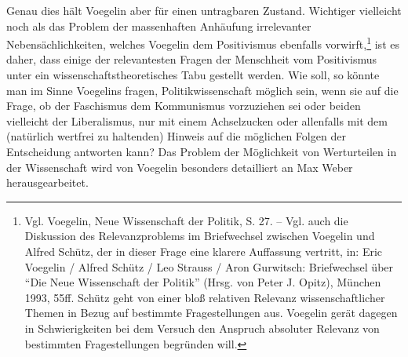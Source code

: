 Genau dies hält Voegelin aber für einen untragbaren Zustand. Wichtiger
vielleicht noch als das Problem der massenhaften Anhäufung irrelevanter
Nebensächlichkeiten, welches Voegelin dem Positivismus ebenfalls
vorwirft,\footnote{Vgl. Voegelin, Neue Wissenschaft der Politik, S. 27. -- Vgl.
  auch die Diskussion des Relevanzproblems im Briefwechsel zwischen Voegelin
  und Alfred Schütz, der in dieser Frage eine klarere Auf\/fassung vertritt,
  in: Eric Voegelin / Alfred Schütz / Leo Strauss / Aron Gurwitsch:
  Briefwechsel über "`Die Neue Wissenschaft der Politik"' (Hrsg. von Peter J.
  Opitz), München 1993, 55ff. Schütz geht von einer bloß relativen Relevanz
  wissenschaftlicher Themen in Bezug auf bestimmte Fragestellungen aus.
  Voegelin gerät dagegen in Schwierigkeiten bei dem Versuch den Anspruch
  absoluter Relevanz von bestimmten Fragestellungen begründen will.} ist es
daher, dass einige der relevantesten Fragen der Menschheit vom Positivismus
unter ein wissenschaftstheoretisches Tabu gestellt werden. Wie soll, so könnte
man im Sinne Voegelins fragen, Politikwissenschaft möglich sein, wenn sie auf
die Frage, ob der Faschismus dem Kommunismus vorzuziehen sei oder beiden
vielleicht der Liberalismus, nur mit einem Achselzucken oder allenfalls mit
dem (natürlich wertfrei zu haltenden) Hinweis auf die möglichen Folgen der
Entscheidung antworten kann?  Das Problem der Möglichkeit von Werturteilen in
der Wissenschaft wird von Voegelin besonders detailliert an Max Weber
herausgearbeitet.

